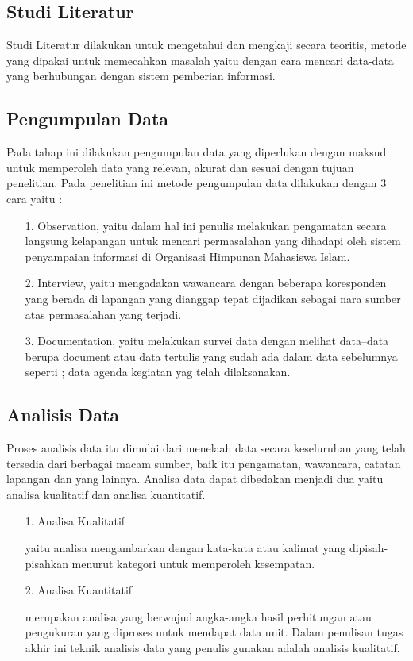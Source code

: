 \documentclass{jtetiproposalskripsi}
\begin{document}
\subsection{Studi Literatur}
Studi Literatur dilakukan untuk mengetahui dan mengkaji secara teoritis, metode yang dipakai untuk memecahkan masalah yaitu dengan cara mencari data-data yang berhubungan dengan sistem pemberian informasi.

\subsection{Pengumpulan Data}
Pada tahap ini dilakukan pengumpulan data yang diperlukan dengan maksud untuk memperoleh data yang relevan, akurat dan sesuai dengan tujuan penelitian. Pada penelitian ini metode pengumpulan data dilakukan dengan 3 cara yaitu :
\begin{itemize}

\item[1.]	Observation, yaitu dalam hal ini penulis melakukan pengamatan secara langsung kelapangan untuk mencari permasalahan yang dihadapi oleh sistem penyampaian informasi di Organisasi Himpunan Mahasiswa Islam.
\item[2.]	Interview, yaitu mengadakan wawancara dengan beberapa koresponden yang berada di lapangan yang dianggap tepat dijadikan sebagai nara sumber atas permasalahan yang terjadi.
\item[3.]	Documentation, yaitu melakukan survei data dengan melihat data–data berupa document atau data tertulis yang sudah ada dalam data sebelumnya seperti ; data agenda kegiatan yag telah dilaksanakan.
\end{itemize}

\subsection{Analisis Data}
Proses analisis data itu dimulai dari menelaah data secara keseluruhan yang telah tersedia dari berbagai macam sumber, baik itu pengamatan, wawancara, catatan lapangan dan yang lainnya. Analisa data dapat dibedakan menjadi dua yaitu analisa kualitatif dan analisa kuantitatif.
\begin{itemize}

\item[1.]	Analisa Kualitatif

yaitu analisa mengambarkan dengan kata-kata atau kalimat yang dipisah-pisahkan menurut kategori untuk memperoleh kesempatan.


\item[2.]	Analisa Kuantitatif

merupakan analisa yang berwujud angka-angka hasil perhitungan atau pengukuran yang diproses untuk mendapat data unit.
Dalam penulisan tugas akhir ini teknik analisis data yang penulis gunakan adalah analisis kualitatif.
\end{itemize}
\end{document}
